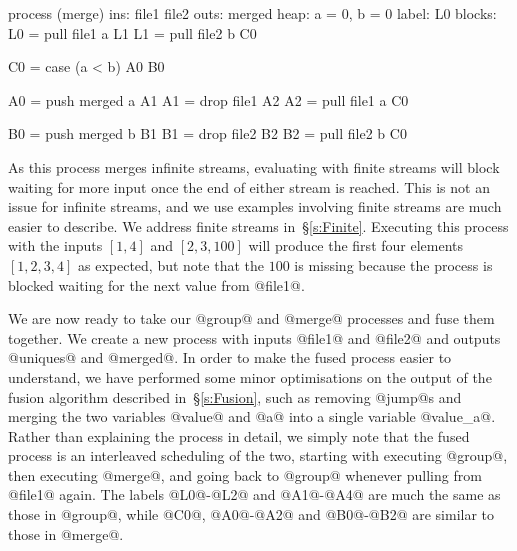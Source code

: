 \begin{code}
process (merge)
     ins: file1 file2
    outs: merged
    heap: {a = 0, b = 0}
   label: L0
  blocks: L0 = pull file1 a  L1
          L1 = pull file2 b  C0

          C0 = case (a < b)  A0     B0

          A0 = push merged a A1
          A1 = drop file1    A2
          A2 = pull file1  a C0

          B0 = push merged b B1
          B1 = drop file2    B2
          B2 = pull file2  b C0
\end{code}



As this process merges infinite streams, evaluating with finite streams will block waiting for more input once the end of either stream is reached.
This is not an issue for infinite streams, and we use examples involving finite streams are much easier to describe.
We address finite streams in~\S\ref{s:Finite}.
Executing this process with the inputs $[1, 4]$ and $[2, 3, 100]$ will produce the first four elements $[1, 2, 3, 4]$ as expected, but note that the $100$ is missing because the process is blocked waiting for the next value from @file1@.

We are now ready to take our @group@ and @merge@ processes and fuse them together. 
We create a new process with inputs @file1@ and @file2@ and outputs @uniques@ and @merged@.
In order to make the fused process easier to understand, we have performed some minor optimisations on the output of the fusion algorithm described in~\S\ref{s:Fusion}, such as removing @jump@s and merging the two variables @value@ and @a@ into a single variable @value_a@.
Rather than explaining the process in detail, we simply note that the fused process is an interleaved scheduling of the two, starting with executing @group@, then executing @merge@, and going back to @group@ whenever pulling from @file1@ again.
The labels @L0@-@L2@ and @A1@-@A4@ are much the same as those in @group@, while @C0@, @A0@-@A2@ and @B0@-@B2@ are similar to those in @merge@.

